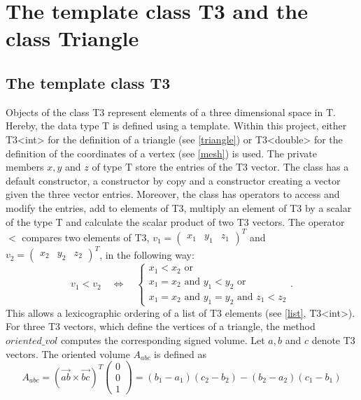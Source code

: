 \documentclass[10pt]{article}
\begin{document}
\section{The template class T3 and the class Triangle}

\subsection{The template class T3} \label{T3}

Objects of the class {\ttfamily T3} represent elements of a three dimensional space in {\ttfamily T}. Hereby, the data type {\ttfamily T} is defined using a template. Within this project, either {\ttfamily T3<int>} for the definition of a triangle (see \ref{triangle}) or {\ttfamily T3<double>} for the definition of the coordinates of a vertex (see \ref{mesh}) is used. The private members $x,y$ and $z$ of type {\ttfamily T} store the entries of the {\ttfamily T3} vector. The class has a default constructor, a constructor by copy and a constructor creating a vector given the three vector entries. Moreover, the class has operators to access and modify the entries, add to elements of {\ttfamily T3}, multiply an element of {\ttfamily T3} by a scalar of the type {\ttfamily T} and calculate the scalar product of two {\ttfamily T3} vectors. The operator $<$ compares two elements of {\ttfamily T3}, $v_1 = \begin{pmatrix} x_1 & y_1 & z_1 \end{pmatrix}^T$ and $v_2 = \begin{pmatrix} x_2 & y_2 & z_2 \end{pmatrix}^T$, in the following way:
$$ v_1 < v_2 \quad \Leftrightarrow \quad \begin{cases}
 x_1 < x_2 \text{ or }\\
 x_1 = x_2 \text{ and } y_1 < y_2 \text{ or }\\
 x_1 = x_2 \text{ and } y_1 = y_2 \text{ and } z_1 < z_2
\end{cases}. $$ 
This allows a lexicographic ordering of a list of {\ttfamily T3} elements (see \ref{list}, {\ttfamily T3<int>}). For three {\ttfamily T3} vectors, which define the vertices of a triangle, the method $ oriented\_vol $ computes the corresponding signed volume. Let $a,b$ and $c$ denote {\ttfamily T3} vectors. The oriented volume $A_{abc}$ is defined as
$$ A_{abc} = \left( \overrightarrow{ab} \times \overrightarrow{bc} \right)^T \begin{pmatrix} 0 \\ 0 \\ 1 \end{pmatrix} = (b_1-a_1)(c_2-b_2) - (b_2-a_2)(c_1-b_1)$$
\end{document}

